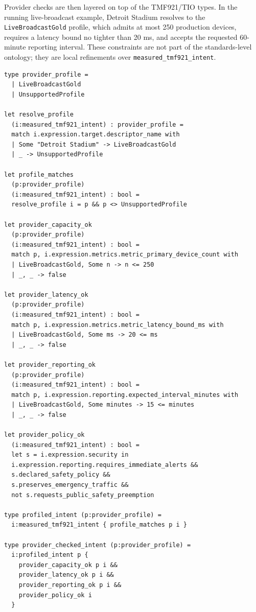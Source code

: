 \documentclass[conference]{IEEEtran}
\begin{document}
Provider checks are then layered on top of the TMF921/TIO types. In the running live-broadcast example, Detroit Stadium resolves to the \texttt{LiveBroadcastGold} profile, which admits at most 250 production devices, requires a latency bound no tighter than 20 ms, and accepts the requested 60-minute reporting interval. These constraints are not part of the standards-level ontology; they are local refinements over \texttt{measured\_tmf921\_intent}.

\begin{lstlisting}[style=fstar,caption={Provider-specific F* refinement types over the TMF921 types.},label={lst:provider-refinement}]
type provider_profile =
  | LiveBroadcastGold
  | UnsupportedProfile

let resolve_profile
  (i:measured_tmf921_intent) : provider_profile =
  match i.expression.target.descriptor_name with
  | Some "Detroit Stadium" -> LiveBroadcastGold
  | _ -> UnsupportedProfile

let profile_matches
  (p:provider_profile)
  (i:measured_tmf921_intent) : bool =
  resolve_profile i = p && p <> UnsupportedProfile

let provider_capacity_ok
  (p:provider_profile)
  (i:measured_tmf921_intent) : bool =
  match p, i.expression.metrics.metric_primary_device_count with
  | LiveBroadcastGold, Some n -> n <= 250
  | _, _ -> false

let provider_latency_ok
  (p:provider_profile)
  (i:measured_tmf921_intent) : bool =
  match p, i.expression.metrics.metric_latency_bound_ms with
  | LiveBroadcastGold, Some ms -> 20 <= ms
  | _, _ -> false

let provider_reporting_ok
  (p:provider_profile)
  (i:measured_tmf921_intent) : bool =
  match p, i.expression.reporting.expected_interval_minutes with
  | LiveBroadcastGold, Some minutes -> 15 <= minutes
  | _, _ -> false

let provider_policy_ok
  (i:measured_tmf921_intent) : bool =
  let s = i.expression.security in
  i.expression.reporting.requires_immediate_alerts &&
  s.declared_safety_policy &&
  s.preserves_emergency_traffic &&
  not s.requests_public_safety_preemption

type profiled_intent (p:provider_profile) =
  i:measured_tmf921_intent { profile_matches p i }

type provider_checked_intent (p:provider_profile) =
  i:profiled_intent p {
    provider_capacity_ok p i &&
    provider_latency_ok p i &&
    provider_reporting_ok p i &&
    provider_policy_ok i
  }
\end{lstlisting}
\end{document}
